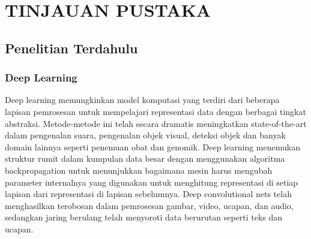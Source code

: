 \chapter{TINJAUAN PUSTAKA}
\label{chap:tinjauanpustaka}


\section{Penelitian Terdahulu}
\label{sec:penelitianterdahulu}

\subsection{Deep Learning}
\label{subsec:DeepLearning}

Deep learning memungkinkan model komputasi yang terdiri dari beberapa lapisan pemrosesan untuk mempelajari representasi data dengan berbagai tingkat abstraksi. Metode-metode ini telah secara dramatis meningkatkan state-of-the-art dalam pengenalan suara, pengenalan objek visual, deteksi objek dan banyak domain lainnya seperti penemuan obat dan genomik. Deep learning menemukan struktur rumit dalam kumpulan data besar dengan menggunakan algoritma backpropagation untuk menunjukkan bagaimana mesin harus mengubah parameter internalnya yang digunakan untuk menghitung representasi di setiap lapisan dari representasi di lapisan sebelumnya. Deep convolutional nets telah menghasilkan terobosan dalam pemrosesan gambar, video, ucapan, dan audio, sedangkan jaring berulang telah menyoroti data berurutan seperti teks dan ucapan.\citep{article}







